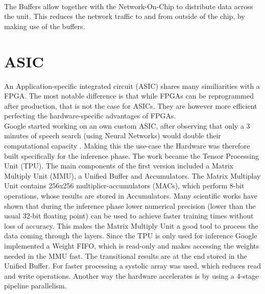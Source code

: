 \documentclass[conference]{IEEEtran}
\begin{document}
\\
The Buffers allow together with the Network-On-Chip to distribute data across the unit. This reduces the network traffic to and from outside of the chip, by making use of the buffers. 
\\

\section{ASIC}
An Application-specific integrated circuit (ASIC) shares many similiarities with a FPGA. The most notable difference is that while FPGAs can be reprogrammed after production, that is not the case for ASICs. They are however more efficient perfecting the hardware-specific advantages of FPGAs.
\\
Google started working on an own custom ASIC, after observing that only a 3 minutes of speech search (using Neural Networks) would double their computational capacity \cite{jouppi2017datacenter}. Making this the use-case the Hardware was therefore built specifically for the inference phase. The work became the Tensor Processing Unit (TPU). The main components of the first version included a Matrix Multiply Unit (MMU), a Unified Buffer and Accumulators. The Matrix Multiplay Unit contains 256x256 multiplier-accumulators (MACs), which perform 8-bit operations, whose results are stored in Accumulators. Many scientific works have shown that during the inference phase lower numerical precision (lower than the usual 32-bit floating point) can be used to achieve faster training times without loss of accuracy\cite{rodriguez2018lower}. This makes the Matrix Multiply Unit a good tool to process the data coming through the layers. Since the TPU is only used for inference Google implemented a Weight FIFO, which is read-only and makes accessing the weights needed in the MMU fast. The transitional results are at the end stored in the Unified Buffer. For faster processing a systolic array was used, which reduces read and write operations. 
Another way the hardware accelerates is by using a 4-stage pipeline parallelism.
\end{document}
